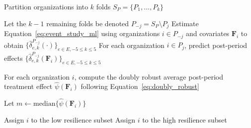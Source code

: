 
\begin{algorithm}[ht]
\caption{Forest Split: $k$-Fold Procedure}\label{alg:forest_split}
\begin{algorithmic}[1]

\State Partition organizations into $k$ folds $S_P = \{P_1,\dots,P_k\}$

  
    \State Let the $k-1$ remaining folds be denoted $P_{-j} = S_P \setminus P_j$
    \State Estimate Equation~\ref{eq:event_study_ml} using organizations $i \in P_{-j}$ and covariates $\mathbf{F}_i$ to obtain 
        $\{\hat{\delta}_{e,k}^{P_{-j}}(\cdot)\}_{e \in E, -5 \le k \le 5}$
    \State For each organization $i \in P_j$, predict post-period effects 
        $\{\hat{\delta}_{e,k}^{P_{-j}}(\mathbf{F}_i)\}_{e \in E, -5 \le k \le 5}$
\EndFor

\State For each organization $i$, compute the doubly robust average post-period treatment effect 
    $\hat{\psi}(\mathbf{F}_i)$ following Equation~\ref{eq:doubly_robust}

\State Let $m \gets \text{median}\{\hat{\psi}(\mathbf{F}_i)\}$

        \State Assign $i$ to the low resilience subset
    \Else
        \State Assign $i$ to the high resilience subset
    \EndIf
\EndFor

\end{algorithmic}
\end{algorithm}
